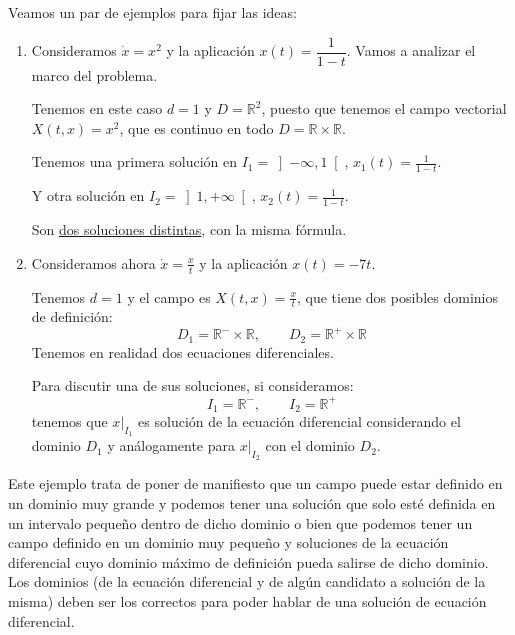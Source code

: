\begin{ejemplo}
    Veamos un par de ejemplos para fijar las ideas:
    \begin{enumerate}
        \item Consideramos $\dot{x} = x^2$ y la aplicación $x(t) = \dfrac{1}{1-t}$. Vamos a analizar el marco del problema.

            Tenemos en este caso $d=1$ y $D=\mathbb{R}^2$, puesto que tenemos el campo vectorial $X(t,x) = x^2$, que es continuo en todo $D=\mathbb{R}\times \mathbb{R}$. 

            Tenemos una primera solución en $I_1 = \left]-\infty,1\right[$, $x_1(t) = \frac{1}{1-t}$.

            Y otra solución en $I_2 = \left]1,+\infty\right[$, $x_2(t) = \frac{1}{1-t}$.

            Son \underline{dos soluciones distintas}, con la misma fórmula.
        \item Consideramos ahora $\dot{x} = \frac{x}{t}$ y la aplicación $x(t) = -7t$.

            Tenemos $d=1$ y el campo es $X(t,x) = \frac{x}{t}$, que tiene dos posibles dominios de definición:
            \begin{equation*}
                D_1 = \mathbb{R}^-\times \mathbb{R}, \qquad D_2 = \mathbb{R}^+\times \mathbb{R}
            \end{equation*}
            Tenemos en realidad dos ecuaciones diferenciales.

            Para discutir una de sus soluciones, si consideramos:
            \begin{equation*}
                I_1 = \mathbb{R}^-, \qquad I_2 = \mathbb{R}^+
            \end{equation*}
            tenemos que $x\big|_{I_1}$ es solución de la ecuación diferencial considerando el dominio $D_1$ y análogamente para $x\big|_{I_2}$ con el dominio $D_2$.
    \end{enumerate}
\end{ejemplo}

\noindent
Este ejemplo trata de poner de manifiesto que un campo puede estar definido en un dominio muy grande y podemos tener una solución que solo esté definida en un intervalo pequeño dentro de dicho dominio o bien que podemos tener un campo definido en un dominio muy pequeño y soluciones de la ecuación diferencial cuyo dominio máximo de definición pueda salirse de dicho dominio. Los dominios (de la ecuación diferencial y de algún candidato a solución de la misma) deben ser los correctos para poder hablar de una solución de ecuación diferencial.\\

